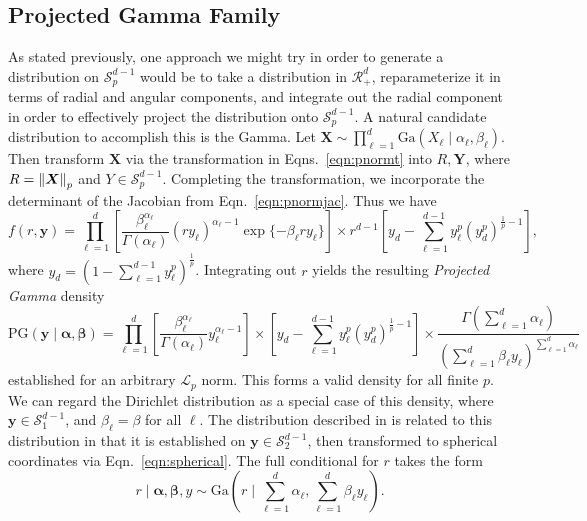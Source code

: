 \subsection{Projected Gamma Family}
As stated previously, one approach we might try in order to generate a distribution on
  $\mathcal{S}_{p}^{d-1}$ would be to take a distribution in $\mathcal{R}_{+}^d$, reparameterize
  it in terms of radial and angular components, and integrate out the radial component in order to
  effectively project the distribution onto $\mathcal{S}_{p}^{d-1}$.  A natural candidate distribution
  to accomplish this is the Gamma.  Let
    $\bm{ X} \sim \prod_{\ell = 1}^d\text{Ga}\left(X_{\ell}\mid\alpha_{\ell},\beta_{\ell}\right)$.
  Then transform $\bm{ X}$ via the transformation in Eqns.~\ref{eqn:pnormt} into $R,\bm{ Y}$, where
  $R = \pnorm{\bm{ X}}{p}$ and $Y\in \mathcal{S}_{p}^{d-1}$.  Completing the transformation, we
  incorporate the determinant of the Jacobian from Eqn.~\ref{eqn:pnormjac}.  Thus we have
  \begin{equation}
    \label{eqn:protopg}
    f(r,\bm{ y}) = \prod_{\ell = 1}^{d}
      \left[\frac{\beta_{\ell}^{\alpha_{\ell}}}{\Gamma(\alpha_{\ell})}(ry_{\ell})^{\alpha_{\ell} - 1}
          \exp\lbrace-\beta_{\ell}ry_{\ell}\rbrace\right]
      \times r^{d-1}\left[y_d -
            {\textstyle \sum}_{\ell = 1}^{d-1}y_{\ell}^p\left(y_d^p\right)^{\frac{1}{p} - 1}\right],
  \end{equation}
  where $y_d = \left(1 - \sum_{\ell = 1}^{d-1}y_{\ell}^p\right)^{\frac{1}{p}}$. Integrating out $r$
  yields the resulting \emph{Projected Gamma} density
  \begin{equation}
    \label{eqn:projgamma}
    \text{PG}(\bm{ y}\mid\bm{ \alpha},\bm{ \beta}) =
          \prod_{\ell = 1}^d\left[\frac{\beta_{\ell}^{\alpha_{\ell}}}{\Gamma(\alpha_{\ell})}
                y_{\ell}^{\alpha_{\ell} - 1}\right]
      \times \left[y_d -
          {\textstyle \sum}_{\ell = 1}^{d-1}y_{\ell}^p\left(y_d^p\right)^{\frac{1}{p} - 1}\right]
      \times \frac{\Gamma({\textstyle\sum}_{\ell = 1}^d\alpha_{\ell})}{\left({\textstyle\sum}_{\ell = 1}^d
                    \beta_{\ell}y_{\ell}\right)^{{\scriptstyle\sum_{\ell = 1}^d \alpha_{\ell}}}}
  \end{equation}
  established for an arbitrary $\mathcal{L}_p$ norm. This forms a valid density for all finite $p$.
  We can regard the Dirichlet distribution as a special case of this density, where
  $\bm{ y}\in \mathcal{S}_1^{d-1}$, and $\beta_{\ell} = \beta$ for all $\ell$.  The distribution
  described in \cite{nunez2019} is related to this distribution in that it is established on
  $\bm{ y}\in \mathcal{S}_2^{d-1}$, then transformed to spherical coordinates via Eqn.~\ref{eqn:spherical}.
  The full conditional for $r$ takes the form
  \begin{equation}
    \label{eqn:rfullcond}
    r\mid\bm{ \alpha},\bm{ \beta}, y \sim \text{Ga}\left(r\mid{\textstyle\sum}_{\ell = 1}^d
                    \alpha_{\ell}, {\textstyle\sum}_{\ell = 1}^d \beta_{\ell}y_{\ell}\right).
  \end{equation}

